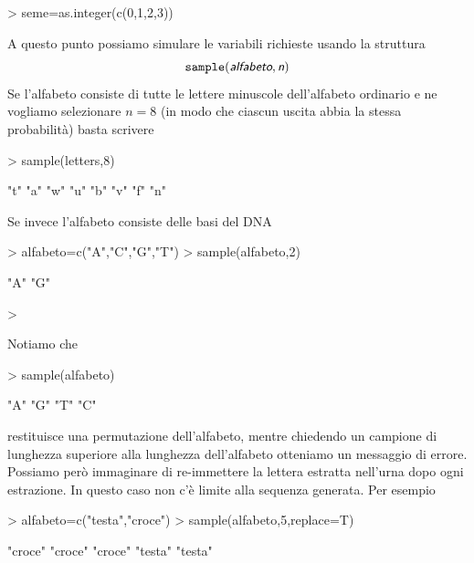 \documentclass[onecolumn,12pt]{book}
\newcommand{\varia}[1]{\textsl{\textsf{#1}}}
\begin{document}
\begin{Schunk}
\begin{Sinput}
> seme=as.integer(c(0,1,2,3))
\end{Sinput}
\end{Schunk}
A questo punto possiamo simulare le variabili richieste usando la struttura
\begin{equation}\texttt{sample}(\varia{alfabeto},\varia{n})\end{equation}
Se l'alfabeto consiste di tutte le lettere minuscole dell'alfabeto ordinario e ne vogliamo selezionare $n=8$  (in modo che ciascun uscita abbia la stessa probabilit\`a)  basta scrivere
\begin{Schunk}
\begin{Sinput}
> sample(letters,8)
\end{Sinput}
\begin{Soutput}
[1] "t" "a" "w" "u" "b" "v" "f" "n"
\end{Soutput}
\end{Schunk}
  Se invece l'alfabeto consiste delle basi del DNA
\begin{Schunk}
\begin{Sinput}
> alfabeto=c("A","C","G","T")
> sample(alfabeto,2)
\end{Sinput}
\begin{Soutput}
[1] "A" "G"
\end{Soutput}
\begin{Sinput}
> 
\end{Sinput}
\end{Schunk}
Notiamo che
\begin{Schunk}
\begin{Sinput}
>  sample(alfabeto)
\end{Sinput}
\begin{Soutput}
[1] "A" "G" "T" "C"
\end{Soutput}
\end{Schunk}
restituisce una permutazione dell'alfabeto, mentre chiedendo un campione di lunghezza superiore alla lunghezza dell'alfabeto otteniamo un messaggio di errore. Possiamo per\`o immaginare di re-immettere la lettera estratta nell'urna dopo ogni estrazione. In questo caso non c'\`e limite alla sequenza generata.
Per esempio
\begin{Schunk}
\begin{Sinput}
> alfabeto=c("testa","croce")
> sample(alfabeto,5,replace=T)
\end{Sinput}
\begin{Soutput}
[1] "croce" "croce" "croce" "testa" "testa"
\end{Soutput}
\end{Schunk}
\end{document}
